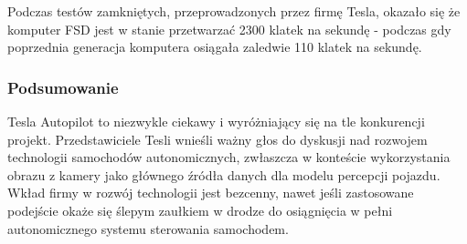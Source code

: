 Podczas testów zamkniętych, przeprowadzonych przez firmę Tesla, okazało się że komputer FSD jest w stanie przetwarzać 2300 klatek na sekundę - podczas gdy poprzednia generacja komputera osiągała zaledwie 110 klatek na sekundę.

\subsubsection{Podsumowanie}
Tesla Autopilot to niezwykle ciekawy i wyróżniający się na tle konkurencji projekt. Przedstawiciele Tesli wnieśli ważny głos do dyskusji nad rozwojem technologii samochodów autonomicznych, zwłaszcza w konteście wykorzystania obrazu z kamery jako głównego źródła danych dla modelu percepcji pojazdu. Wkład firmy w rozwój technologii jest bezcenny, nawet jeśli zastosowane podejście okaże się ślepym zaułkiem w drodze do osiągnięcia w pełni autonomicznego systemu sterowania samochodem.